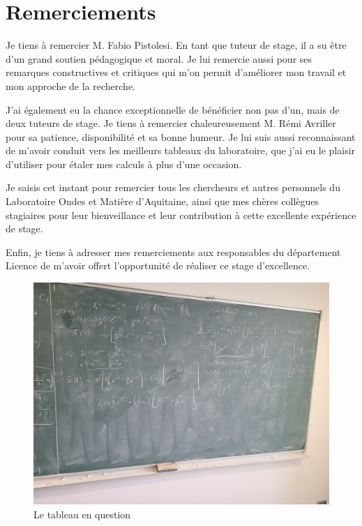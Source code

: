 \chapter*{Remerciements}
%
Je tiens à remercier M. Fabio Pistolesi. En tant que tuteur de stage, il a su être d'un grand soutien pédagogique et moral. Je lui remercie aussi pour ses remarques constructives et critiques qui m'on permit d'améliorer mon travail et mon approche de la recherche.


J'ai également eu la chance exceptionnelle de bénéficier non pas d'un, mais de deux tuteurs de stage. Je tiens à remercier chaleureusement M. Rémi Avriller pour sa patience, disponibilité et sa bonne humeur. 
Je lui suis aussi reconnaissant de m'avoir conduit vers les meilleurs tableaux du laboratoire, que j'ai eu le plaisir d'utiliser pour étaler mes calculs à plus d'une occasion.

Je saisis cet instant pour remercier tous les chercheurs
et autres personnels du Laboratoire Ondes et Matière d'Aquitaine, ainsi que mes chères collègues stagiaires pour leur bienveillance et leur contribution à cette excellente expérience de stage.

Enfin, je tiens à adresser mes remerciements aux responsables du département Licence de m'avoir offert l'opportunité de réaliser ce stage d'excellence.
\newline
\newline
\begin{figure}[H]
    \centering
    \includegraphics[width=.5\textwidth]{images/thankyou/tableux.jpg}
    \caption{Le tableau en question}
\end{figure}

